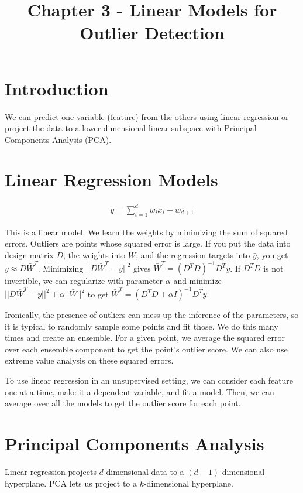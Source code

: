 \documentclass[a4paper]{article}
\title{Chapter 3 - Linear Models for Outlier Detection}
\date{}
\begin{document}
\maketitle

\section{Introduction}
We can predict one variable (feature) from the others using linear regression
or project the data to a lower dimensional linear subspace with Principal
Components Analysis (PCA).
\section{Linear Regression Models}
\begin{align}
  y = \sum_{i=1}^{d}{w_i x_i} + w_{d+1}
\end{align}

This is a linear model. We learn the weights by minimizing the sum of squared
errors. Outliers are points whose squared error is large. If you put the
data into design matrix $D$, the weights into $\bar{W}$, and the regression
targets into $\bar{y}$, you get $\bar{y} \approx D \bar{W}^T$. Minimizing
$||D \bar{W}^T - \bar{y}||^2$ gives $\bar{W}^T = (D^T D)^{-1}D^T \bar{y}$.
If $D^T D$ is not invertible, we can regularize with parameter $\alpha$ and
minimize $||D \bar{W}^T - \bar{y}||^2 + \alpha ||\bar{W}||^2$ to get
$\bar{W}^T = (D^T D + \alpha I)^{-1}D^T \bar{y}$.

Ironically, the presence of outliers can mess up the inference of the parameters,
so it is typical to randomly sample some points and fit those. We do this
many times and create an ensemble. For a given point, we average the squared
error over each ensemble component to get the point's outlier score. We can also
use extreme value analysis on these squared errors.

To use linear regression in an unsupervised setting, we can consider each
feature one at a time, make it a dependent variable, and fit a model. Then,
we can average over all the models to get the outlier score for each point.

\section{Principal Components Analysis}
Linear regression projects $d$-dimensional data to a $(d-1)$-dimensional
hyperplane. PCA lets us project to a $k$-dimensional hyperplane.
\end{document}
